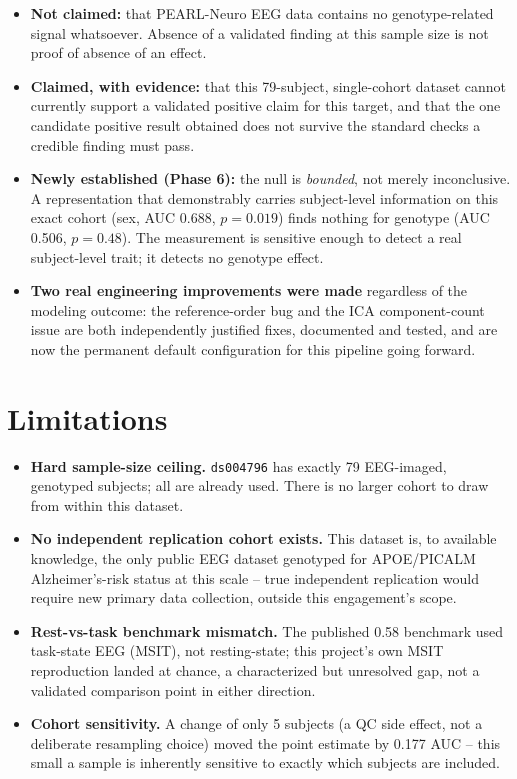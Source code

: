 \documentclass[11pt]{article}
\begin{document}
\begin{itemize}[leftmargin=1.2cm]
  \item \textbf{Not claimed:} that PEARL-Neuro EEG data contains no
        genotype-related signal whatsoever. Absence of a validated
        finding at this sample size is not proof of absence of an
        effect.
  \item \textbf{Claimed, with evidence:} that this 79-subject,
        single-cohort dataset cannot currently support a validated
        positive claim for this target, and that the one candidate
        positive result obtained does not survive the standard checks a
        credible finding must pass.
  \item \textbf{Newly established (Phase 6):} the null is
        \emph{bounded}, not merely inconclusive. A representation that
        demonstrably carries subject-level information on this exact
        cohort (sex, AUC 0.688, $p=0.019$) finds nothing for genotype
        (AUC 0.506, $p=0.48$). The measurement is sensitive enough to
        detect a real subject-level trait; it detects no genotype
        effect.
  \item \textbf{Two real engineering improvements were made} regardless
        of the modeling outcome: the reference-order bug and the ICA
        component-count issue are both independently justified fixes,
        documented and tested, and are now the permanent default
        configuration for this pipeline going forward.
\end{itemize}

\section{Limitations}

\begin{itemize}[leftmargin=1.2cm]
  \item \textbf{Hard sample-size ceiling.} \texttt{ds004796} has exactly
        79 EEG-imaged, genotyped subjects; all are already used. There is
        no larger cohort to draw from within this dataset.
  \item \textbf{No independent replication cohort exists.} This dataset
        is, to available knowledge, the only public EEG dataset genotyped
        for APOE/PICALM Alzheimer's-risk status at this scale -- true
        independent replication would require new primary data
        collection, outside this engagement's scope.
  \item \textbf{Rest-vs-task benchmark mismatch.} The published 0.58
        benchmark used task-state EEG (MSIT), not resting-state; this
        project's own MSIT reproduction landed at chance, a
        characterized but unresolved gap, not a validated comparison
        point in either direction.
  \item \textbf{Cohort sensitivity.} A change of only 5 subjects (a QC
        side effect, not a deliberate resampling choice) moved the point
        estimate by 0.177 AUC -- this small a sample is inherently
        sensitive to exactly which subjects are included.
\end{itemize}
\end{document}
